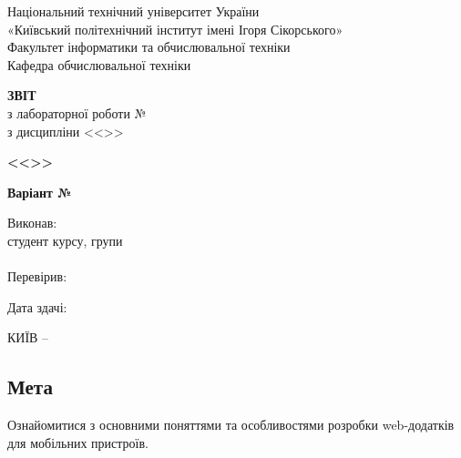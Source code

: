 \documentclass[14pt, a4paper]{extreport}
\begin{document}
	
	\begin{titlepage}
		\begin{center}
			\normalsize
			Національний технічний університет України\\
			«Київський політехнічний інститут імені Ігоря Сікорського» \\[0.5em]
			Факультет інформатики та обчислювальної техніки\\
			Кафедра обчислювальної техніки
			
			\vfill
			
			{\large \textbf{ЗВІТ}\\[0.5em]}
			{з лабораторної роботи №\LabNumber \\}
			{з дисципліни <<\CourseTitle>>}
			
			\vspace{2em}
			
			{\textbf{<<\Topic>>}}
			
			\vspace{1em}
			
			{\textbf{Варіант №\Variant}}
			
			\vfill
			
			\begin{flushright}
				Виконав: \\ студент \CourseNumber{} курсу, групи \StudentGroup \\
				\StudentName \\[1em]
				Перевірив: \\ \Teacher
			\end{flushright}
			
			\vfill
			
			\begin{flushright}
				Дата здачі: \DTMtoday
			\end{flushright}
			
			\vspace{5em}
			КИЇВ -- \ReportYear
		\end{center}
	\end{titlepage}
	
	\clearpage
	\setcounter{page}{2}
	
	\subsection*{Мета} 
	Ознайомитися з основними поняттями та особливостями розробки web-додатків для мобільних пристроїв.
	
\end{document}
